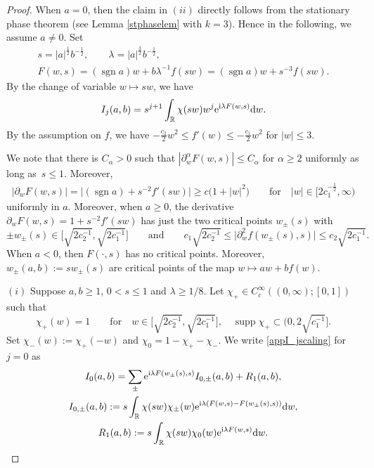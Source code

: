 \documentclass[pdftex]{sigma}
\numberwithin{equation}{section}
\def\R{\mathbb{R}}%
\DeclareMathOperator{\supp}{supp}%
\DeclareMathOperator{\sgn}{sgn}%
\def\a{\alpha}
\def\l{\lambda}
\def\pa{\partial}
\begin{document}
\begin{proof}
When $a=0$, then the claim in $(ii)$ directly follows from the stationary phase theorem (see Lemma \ref{stphaselem} with $k=3$). Hence in the following, we assume $a\neq 0$.
Set
\begin{gather*}
s=|a|^{\frac{1}{2}}b^{-\frac{1}{2}},\qquad \l=|a|^{\frac{3}{2}}b^{-\frac{1}{2}},\\ F(w,s)=(\sgn a)w+b\l^{-1}f(sw)=(\sgn a)w+s^{-3}f(sw).
\end{gather*}
By the change of variable $w\mapsto sw$, we have
\begin{align}\label{appI_jscaling}
I_j(a,b)=s^{j+1}\int_{\R}\chi(sw)w^j{\rm e}^{{\rm i}\l F(w,s)}{\rm d}w.
\end{align}
By the assumption on $f$, we have $-\frac{c_2}{2}w^2\leq f'(w)\leq -\frac{c_1}{2}w^2$ for $|w|\leq 3$.

We note that there is $C_{\a}>0$ such that $|\pa_{w}^{\a}F(w,s)|\leq C_{\a}$ for $\a\geq 2$ uniformly as long as~${s\leq 1}$. Moreover,
\begin{align}\label{apprescalef'}
|\pa_wF(w,s)|=\big|(\sgn a)+s^{-2}f'(sw)\big|\geq c\bigl(1+|w|^2\bigr)\qquad \text{for}\quad |w|\in \bigl[2c_1^{-\frac{1}{2}},\infty\bigr)
\end{align}
uniformly in $a$. Moreover, when $a\geq 0$, the derivative $\pa_wF(w,s)=1+s^{-2}f'(sw)$ has just the two critical points $w_{\pm}(s)$ with
\[
\pm w_{\pm}(s)\in \bigl[\sqrt{2c_2^{-1}},\sqrt{2c_1^{-1}}\bigr] \qquad \text{and} \qquad c_1 \sqrt{2c_2^{-1}}\leq\big|\pa_w^2f(w_{\pm}(s),s)\big| \leq c_2 \sqrt{2c_1^{-1}}.
\]
 When $a<0$, then $F(\cdot,s)$ has no critical points. Moreover, $w_{\pm}(a,b):=sw_{\pm}(s)$ are critical points of the map $w\mapsto aw+bf(w)$.

 $(i)$ Suppose $a,b\geq 1$, $0<s\leq 1$ and $\l\geq 1/8$.
Let $\chi_+\in C_c^{\infty}((0,\infty);[0,1])$ such that
\[
\chi_+(w)=1 \qquad \text{for} \quad w\in \bigl[\sqrt{2c_2^{-1}},\sqrt{2c_1^{-1}}\bigr], \quad \supp \chi_+\subset \bigl(0,2\sqrt{c_1^{-1}}\bigr].
\]
 Set $\chi_-(w):=\chi_+(-w)$ and $\chi_0=1-\chi_+-\chi_-$.
We write \eqref{appI_jscaling} for $j=0$ as
\begin{gather*}
I_0(a,b)= \sum_{\pm}{\rm e}^{{\rm i}\l F(w_{\pm}(s),s)}I_{0,\pm}(a,b)+R_1(a,b),\\
I_{0,\pm}(a,b):=s\int_{\R}\chi(sw)\chi_{\pm}(w){\rm e}^{{\rm i}\l (F(w,s)-F(w_{\pm}(s),s))}{\rm d}w,\\
 R_1(a,b):=s\int_{\R}\chi(sw)\chi_{0}(w){\rm e}^{{\rm i}\l F(w,s)}{\rm d}w.
\end{gather*}


\end{proof}
\end{document}
